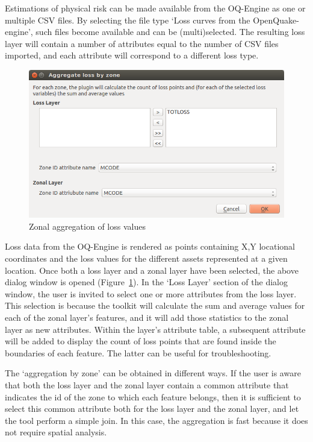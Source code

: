 Estimations of physical risk can be made available from the OQ-Engine as one or
multiple CSV files. By selecting the file type `Loss curves from the
OpenQuake-engine', such files become available and can be (multi)selected. The
resulting loss layer will contain a number of attributes equal to the number of
CSV files imported, and each attribute will correspond to a different loss
type.


\begin{figure}
    \centering
    \includegraphics[width=\textwidth]{../images/image09}
    \caption{Zonal aggregation of loss values}
    \label{fig:zonal_aggregation_of_loss_values}
\end{figure}

Loss data from the OQ-Engine is rendered as points containing X,Y locational
coordinates and the loss values for the different assets represented at a given
location. Once both a loss layer and a zonal layer have been selected, the
above dialog window is opened
(Figure~\ref{fig:zonal_aggregation_of_loss_values}). In the `Loss Layer'
section of the dialog window, the user is invited to select one or more
attributes from the loss layer. This selection is because the toolkit will
calculate the sum and average values for each of the zonal layer's features,
and it will add those statistics to the zonal layer as new attributes. Within
the layer's attribute table, a subsequent attribute will be added to display
the count of loss points that are found inside the boundaries of each feature.
The latter can be useful for troubleshooting.

The `aggregation by zone' can be obtained in different ways. If the user is
aware that both the loss layer and the zonal layer contain a common attribute
that indicates the id of the zone to which each feature belongs, then it is
sufficient to select this common attribute both for the loss layer and the
zonal layer, and let the tool perform a simple join. In this case, the
aggregation is fast because it does not require spatial analysis.

